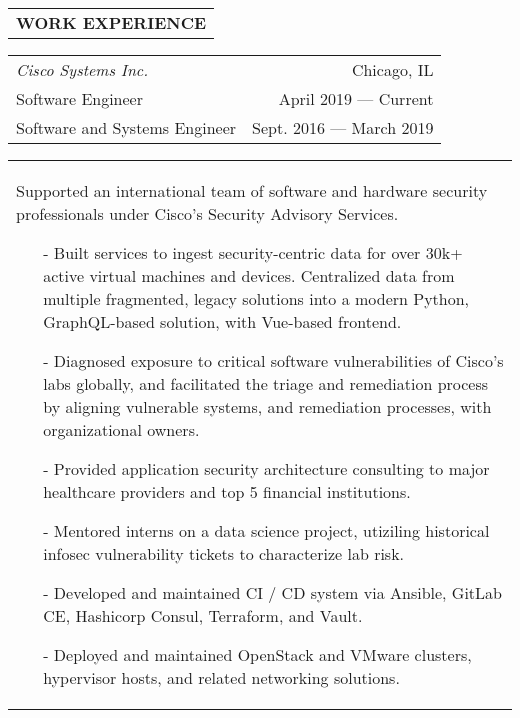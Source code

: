 \begin{tabularx}{\textwidth}{L}
    \textbf{WORK EXPERIENCE}
\end{tabularx}

\begin{tabularx}{\textwidth}{L R}
    \normalsize\textit{Cisco Systems Inc.} & Chicago, IL \\
    \hspace{10pt}Software Engineer & April 2019 --- Current \\
    \hspace{10pt}Software and Systems Engineer & Sept. 2016 --- March 2019 \\
\end{tabularx}
\begin{tabularx}{\textwidth}{X}
    \vspace{1pt}
    Supported an international team of software and hardware security professionals under Cisco's Security Advisory Services.
    \begin{itemize}
        \itemsep{}
        \item[-] Built services to ingest security-centric data for over 30k+ active virtual machines and devices. Centralized data from multiple fragmented, legacy solutions into a modern Python, GraphQL-based solution, with Vue-based frontend.
        \item[-] Diagnosed exposure to critical software vulnerabilities of Cisco's labs globally, and facilitated the triage and remediation process by aligning vulnerable systems, and remediation processes, with organizational owners.
        \item[-] Provided application security architecture consulting to major healthcare providers and top 5 financial institutions.
        \item[-] Mentored interns on a data science project, utiziling historical infosec vulnerability tickets to characterize lab risk.
        \item[-] Developed and maintained CI / CD system via Ansible, GitLab CE, Hashicorp Consul, Terraform, and Vault.
        \item[-] Deployed and maintained OpenStack and VMware clusters, hypervisor hosts, and related networking solutions.
    \end{itemize}
\end{tabularx}

